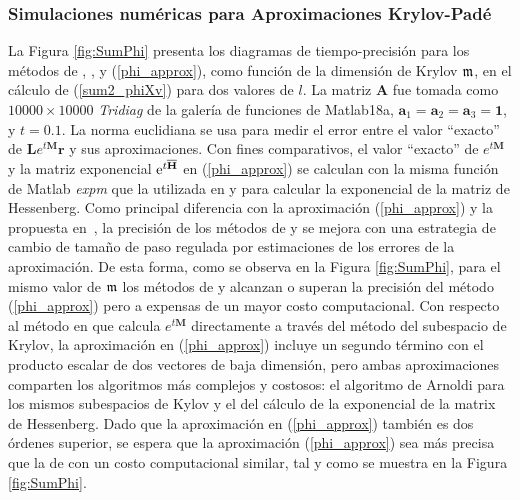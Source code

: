 \subsubsection{Simulaciones numéricas para Aproximaciones Krylov-Padé}
La Figura \ref{fig:SumPhi} presenta los diagramas de tiempo-precisión para los métodos de \cite{hochbruck1997krylov}, \cite{sidje1998expokit}, \cite{niesen2012algorithm} y (\ref{phi_approx}), como función de la dimensión de Krylov $\mathfrak{m}$, en el cálculo de (\ref{sum2_phiXv}) para dos valores de $l$. La matriz $\mathbf{A}$ fue tomada como $10000 \times 10000$ \textit{Tridiag} de la galería de funciones de Matlab18a, $\mathbf{a}_1=\mathbf{a}_2=\mathbf{a}_3=\mathbf{1}$, y $t=0.1$. La norma euclidiana se usa para medir el error entre el valor ``exacto'' de $\mathbf{L} e^{t \mathbf{M}}\mathbf{r}$ y sus aproximaciones. Con fines comparativos, el valor ``exacto'' de $e^{t \mathbf{M}}$ y la matriz exponencial $\mathrm{e}^{t\overline{\mathbf{H}}}$ en (\ref{phi_approx}) se calculan con la misma función de Matlab \textit{expm} que la utilizada en \cite{sidje1998expokit} y \cite{niesen2012algorithm} para calcular la exponencial de la matriz de Hessenberg. Como principal diferencia con la aproximación (\ref{phi_approx}) y la propuesta en~\cite{hochbruck1997krylov}, la precisión de los métodos de \cite{sidje1998expokit} y \cite{niesen2012algorithm} se mejora con una estrategia de cambio de tamaño de paso regulada por estimaciones de los errores de la aproximación. De esta forma, como se observa en la Figura \ref{fig:SumPhi}, para el mismo valor de $\mathfrak{m}$ los métodos de \cite{sidje1998expokit} y \cite{niesen2012algorithm} alcanzan o superan la precisión del método (\ref{phi_approx}) pero a expensas de un mayor costo computacional. Con respecto al método en \cite{hochbruck1997krylov} que calcula $e^{t \mathbf{M}}$ directamente a través del método del subespacio de Krylov, la aproximación en (\ref{phi_approx}) incluye un segundo término con el producto escalar de dos vectores de baja dimensión, pero ambas aproximaciones comparten los  algoritmos más complejos y costosos: el algoritmo de Arnoldi para los mismos subespacios de Kylov y el del cálculo de la exponencial de la  matrix de Hessenberg. Dado que la aproximación en (\ref{phi_approx}) también es dos órdenes superior, se espera que la aproximación (\ref{phi_approx}) sea más precisa que la de \cite{hochbruck1997krylov} con un costo computacional similar, tal y como se muestra en la Figura \ref{fig:SumPhi}.


